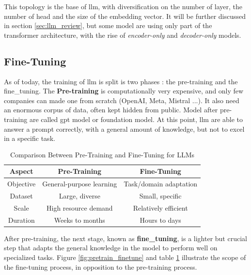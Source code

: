 This topology is the base of \acrshort{llm}, with diversification on the number of layer, the number of head and the size of the embedding vector. It will be further discussed in section \ref{sec:llm_review}, but some model are using only part of the \gls{transformer} architecture, with the rise of \textit{encoder-only} and \textit{decoder-only} models.


\subsection{Fine-Tuning}
\label{sec:fine_tune}
As of today, the training of \acrshort{llm} is split is two phases : the pre-training and the \gls{fine_tuning}. The \textbf{Pre-training} is computationally very expensive, and only few companies can made one from scratch (OpenAI, Meta, Mistral ...). It also need an enormous corpus of data, often kept hidden from public. Model after pre-training are called \acrfull{gpt} model or foundation model. At this point, \acrshort{llm} are able to answer a prompt correctly, with a general amount of knowledge, but not to excel in a specific task.

\begin{table}[h!]
    \centering
    \begin{tabular}{|c|c|c|}
        \hline
        \textbf{Aspect} & \textbf{Pre-Training} & \textbf{Fine-Tuning} \\
        \hline
        Objective & General-purpose learning & Task/domain adaptation \\
        \hline
        Dataset & Large, diverse & Small, specific \\
        \hline
        Scale & High resource demand & Relatively efficient \\
        \hline
        Duration & Weeks to months & Hours to days \\
        \hline
    \end{tabular}
    \caption{Comparison Between Pre-Training and Fine-Tuning for LLMs}
    \label{tab:pretrain_vs_finetune}
\end{table}



After pre-training, the next stage, known as \textbf{\Gls{fine_tuning}}, is a lighter but crucial step that adapts the general knowledge in the model to perform well on specialized tasks. Figure \ref{fig:pretrain_finetune} and table \ref{tab:pretrain_vs_finetune} illustrate the scope of the fine-tuning process, in opposition to the pre-training process.

